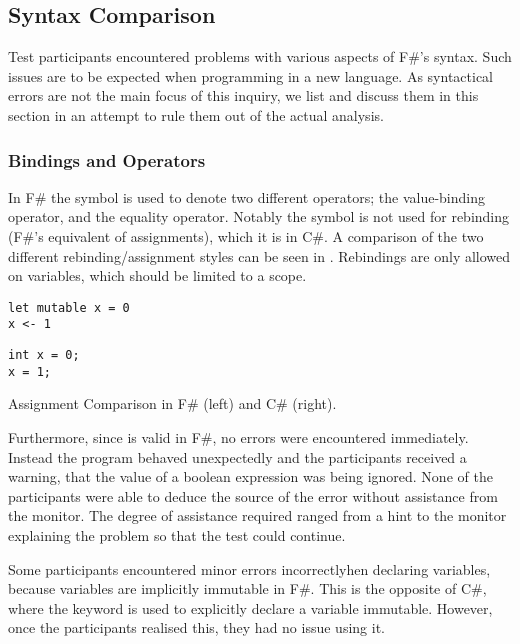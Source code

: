 \subsection{Syntax Comparison}\label{sec:syntax}
Test participants encountered problems with various aspects of F\#'s syntax. Such issues are to be expected when programming in a new language. As syntactical errors are not the main focus of this inquiry, we list and discuss them in this section in an attempt to rule them out of the actual analysis.

\subsubsection{Bindings and Operators}
In F\# the \ttt{=} symbol is used to denote two different operators; the value-binding operator, and the equality operator. Notably the symbol is not used for rebinding (F\#'s equivalent of assignments), which it is in C\#. A comparison of the two different rebinding/assignment styles can be seen in . Rebindings are only allowed on  variables, which should be limited to a scope.

\begin{listing}[H]
\begin{minipage}{.45\textwidth}
\begin{verbatim}
let mutable x = 0
x <- 1
\end{verbatim}
\end{minipage}
\hfill
\begin{minipage}{.45\textwidth}
\begin{verbatim}
int x = 0;
x = 1;
\end{verbatim}
\end{minipage}
\caption{Assignment Comparison in F\# (left) and C\# (right).}
\label{lst:ass-comp}
\end{listing}

Furthermore, since  is valid in F\#, no errors were encountered immediately. Instead the program behaved unexpectedly and the participants received a warning, that the value of a boolean expression was being ignored. None of the participants were able to deduce the source of the error without assistance from the monitor. The degree of assistance required ranged from a hint to the monitor explaining the problem so that the test could continue.

Some participants encountered minor errors incorrectlyhen declaring variables, because variables are implicitly immutable in F\#. This is the opposite of C\#, where the  keyword is used to explicitly declare a variable immutable. However, once the participants realised this, they had no issue using it.

